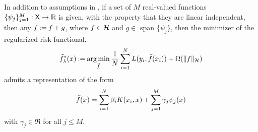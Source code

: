 \begin{theorem}
In addition to assumptions in , if a set of $M$ real-valued functions $\{\psi_j\}_{j=1}^M : {\sf X} \to \mathbb{R}$ is given, with the property that they are linear independent, then any $\tilde f \mathbin{:=} f + g$, where $f \in {\cal H}$ and $g \in$ span $\{\psi_j\}$, then the minimizer of the regularized risk functional,
\begin{equation*}
\tilde f^*_\lambda(x) \mathbin{:=} \mathop{\rm arg{\,}min}_{\tilde f} \frac{1}{N} \sum_{i=1}^N L(y_i,\tilde f(x_i)) + \Omega(\|f\|_{\cal H})
\end{equation*}
admits a representation of the form
\begin{equation*}
\tilde f(x) = \sum_{i=1}^N \beta_i K(x_i, x) + \sum_{j=1}^M \gamma_j \psi_j(x)
\end{equation*}
with $\gamma_j \in \Re$ for all $j \leq M$. 
\end{theorem}

